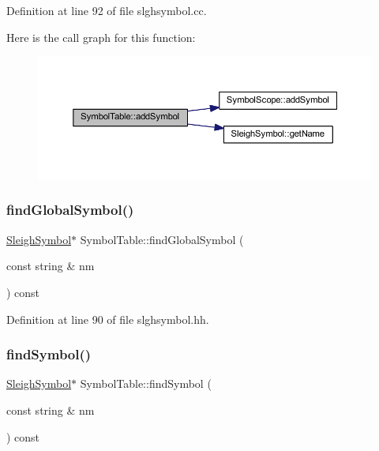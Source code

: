 Definition at line 92 of file slghsymbol.\+cc.

Here is the call graph for this function\+:
\nopagebreak
\begin{figure}[H]
\begin{center}
\leavevmode
\includegraphics[width=350pt]{class_symbol_table_a2555ddfe5e531fa48bb0aaca7e59501d_cgraph}
\end{center}
\end{figure}
\mbox{\label{class_symbol_table_aed0e996f3d74f5a369fdc66ac410add2}} 
\subsubsection{\texorpdfstring{findGlobalSymbol()}{findGlobalSymbol()}}
{\footnotesize\ttfamily \mbox{\hyperlink{class_sleigh_symbol}{Sleigh\+Symbol}}$\ast$ Symbol\+Table\+::find\+Global\+Symbol (\begin{DoxyParamCaption}\item[{const string \&}]{nm }\end{DoxyParamCaption}) const\hspace{0.3cm}{\ttfamily [inline]}}



Definition at line 90 of file slghsymbol.\+hh.

\mbox{\label{class_symbol_table_ad9979f9aa4a6588bbf016182c472b40b}} 
\subsubsection{\texorpdfstring{findSymbol()}{findSymbol()}\hspace{0.1cm}{\footnotesize\ttfamily [1/3]}}
{\footnotesize\ttfamily \mbox{\hyperlink{class_sleigh_symbol}{Sleigh\+Symbol}}$\ast$ Symbol\+Table\+::find\+Symbol (\begin{DoxyParamCaption}\item[{const string \&}]{nm }\end{DoxyParamCaption}) const\hspace{0.3cm}{\ttfamily [inline]}}



